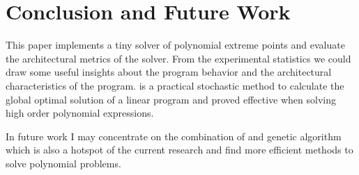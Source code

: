 \section{Conclusion and Future Work}
\label{sec:conclusion}
This paper implements a tiny \SA solver of polynomial extreme points and evaluate the architectural metrics of the solver. From the experimental statistics we could draw some useful insights about the program behavior and the architectural characteristics of the program. \SA is a practical stochastic method to calculate the global optimal solution of a linear program and proved effective when solving high order polynomial expressions.

In future work I may concentrate on the combination of \SA and genetic algorithm which is also a hotspot of the current research and find more efficient methods to solve polynomial problems.   